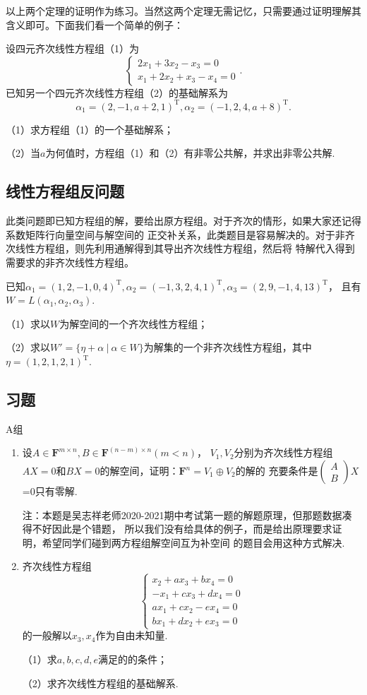 以上两个定理的证明作为练习。当然这两个定理无需记忆，只需要通过证明理解其含义即可。下面我们看一个简单的例子：
\begin{example}
	设四元齐次线性方程组\textup{（1）}为$$\begin{cases}
		2x_1+3x_2-x_3=0 \\ x_1+2x_2+x_3-x_4=0
	\end{cases}.$$已知另一个四元齐次线性方程组\textup{（2）}的基础解系为
	$$\alpha_1=(2,-1,a+2,1)^\mathrm{T},\alpha_2=(-1,2,4,a+8)^\mathrm{T}.$$

	\textup{（1）}求方程组\textup{（1）}的一个基础解系；

	\textup{（2）}当$a$为何值时，方程组\textup{（1）}和\textup{（2）}有非零公共解，并求出非零公共解.
\end{example}
\subsection{线性方程组反问题}
此类问题即已知方程组的解，要给出原方程组。对于齐次的情形，如果大家还记得系数矩阵行向量空间与解空间的
正交补关系，此类题目是容易解决的。对于非齐次线性方程组，则先利用通解得到其导出齐次线性方程组，然后将
特解代入得到需要求的非齐次线性方程组。
\begin{example}
	已知$\alpha_1=(1,2,-1,0,4)^\mathrm{T},\alpha_2=(-1,3,2,4,1)^\mathrm{T},\alpha_3=(2,9,-1,4,13)^\mathrm{T}$，
	且有$W=L(\alpha_1,\alpha_2,\alpha_3)$.

	\textup{（1）}求以$W$为解空间的一个齐次线性方程组；

	\textup{（2）}求以$W'=\{\eta+\alpha\ |\ \alpha\in W\}$为解集的一个非齐次线性方程组，其中$\eta=(1,2,1,2,1)^\mathrm{T}$.
\end{example}
\subsection{习题}
\centerline{\heiti A组}
\begin{enumerate}
	\item 设$A \in \mathbf{F}^{m \times n},B \in \mathbf{F}^{(n-m) \times n}(m<n)$，
	$V_1,V_2$分别为齐次线性方程组$AX=0$和$BX=0$的解空间，证明：$\mathbf{F}^n=V_1\oplus V_2$的解的
	充要条件是$\begin{pmatrix}
		A \\ B
	\end{pmatrix}X$=0只有零解.

	注：本题是吴志祥老师2020-2021期中考试第一题的解题原理，但那题数据凑得不好因此是个错题，
	所以我们没有给具体的例子，而是给出原理要求证明，希望同学们碰到两方程组解空间互为补空间
	的题目会用这种方式解决.
	\item 齐次线性方程组$$\begin{cases}
		x_2+ax_3+bx_4=0 \\ -x_1+cx_3+dx_4=0 \\ ax_1+cx_2-ex_4=0 \\ bx_1+dx_2+ex_3=0
	\end{cases}$$
	的一般解以$x_3,x_4$作为自由未知量.

	（1）求$a,b,c,d,e$满足的的条件；

	（2）求齐次线性方程组的基础解系.
\end{enumerate}

